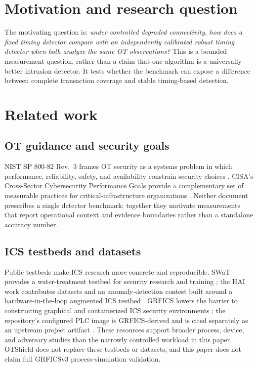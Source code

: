 \documentclass[11pt]{article}
\begin{document}
\section{Motivation and research question}
The motivating question is: \emph{under controlled degraded connectivity, how
does a fixed timing detector compare with an independently calibrated robust
timing detector when both analyze the same OT observations?} This is a bounded
measurement question, rather than a claim that one algorithm is a universally
better intrusion detector. It tests whether the benchmark can expose a difference
between complete transaction coverage and stable timing-based detection.

\section{Related work}
\subsection{OT guidance and security goals}
NIST SP 800-82 Rev.~3 frames OT security as a systems problem in which
performance, reliability, safety, and availability constrain security choices
\cite{stouffer2023ot}. CISA's Cross-Sector Cybersecurity Performance Goals
provide a complementary set of measurable practices for critical-infrastructure
organizations \cite{cisa2023cpg}. Neither document prescribes a single detector
benchmark; together they motivate measurements that report operational context
and evidence boundaries rather than a standalone accuracy number.

\subsection{ICS testbeds and datasets}
Public testbeds make ICS research more concrete and reproducible. SWaT provides
a water-treatment testbed for security research and training
\cite{mathur2016swat}; the HAI work contributes datasets and an anomaly-detection
contest built around a hardware-in-the-loop augmented ICS testbed
\cite{shin2021hai}. GRFICS lowers the barrier to constructing graphical and
containerized ICS security environments \cite{formbygrfics}; the repository's
configured PLC image is GRFICS-derived and is cited separately as an upstream
project artifact \cite{formbygrficsproject}. These resources support broader
process, device, and adversary studies than the narrowly controlled workload in
this paper. OTShield does not replace these testbeds or datasets, and this paper
does not claim full GRFICSv3 process-simulation validation.
\end{document}
